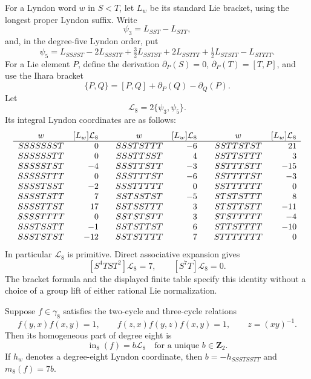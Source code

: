 For a Lyndon word $w$ in $S<T$, let $L_w$ be its standard Lie
bracket, using the longest proper Lyndon suffix. Write
\[
 \psi_3=L_{SST}-L_{STT},
\]
and, in the degree-five Lyndon order, put
\[
 \psi_5=L_{SSSST}-2L_{SSSTT}
       +\tfrac32 L_{SSTST}+2L_{SSTTT}
       +\tfrac12 L_{STSTT}-L_{STTTT}.
\]
For a Lie element $P$, define the derivation
$\partial_P(S)=0$, $\partial_P(T)=[T,P]$, and use the Ihara bracket
\[
 \{P,Q\}=[P,Q]+\partial_P(Q)-\partial_Q(P).
\]
Let
\[
 \mathcal L_8=2\{\psi_3,\psi_5\}.
\]
Its integral Lyndon coordinates are as follows:
\[
\begin{array}{cr@{\qquad}cr@{\qquad}cr}
 w&[L_w]\mathcal L_8&w&[L_w]\mathcal L_8&w&[L_w]\mathcal L_8\\ \hline
 SSSSSSST&0&SSSTSTTT&-6&SSTTSTST&21\\
 SSSSSSTT&0&SSSTTSST&4&SSTTSTTT&3\\
 SSSSSTST&-4&SSSTTSTT&-3&SSTTTSTT&-15\\
 SSSSSTTT&0&SSSTTTST&-6&SSTTTTST&-3\\
 SSSSTSST&-2&SSSTTTTT&0&SSTTTTTT&0\\
 SSSSTSTT&7&SSTSSTST&-5&STSTSTTT&8\\
 SSSSTTST&17&SSTSSTTT&3&STSTTSTT&-11\\
 SSSSTTTT&0&SSTSTSTT&3&STSTTTTT&-4\\
 SSSTSSTT&-1&SSTSTTST&6&STTSTTTT&-10\\
 SSSTSTST&-12&SSTSTTTT&7&STTTTTTT&0
\end{array}
\]
In particular $\mathcal L_8$ is primitive. Direct associative
expansion gives
\begin{equation}\label{eq:weight-eight-mixed-coefficient}
 [S^4TST^2]\mathcal L_8=7,
 \qquad [S^7T]\mathcal L_8=0.
\end{equation}
The bracket formula and the displayed finite table specify this
identity without a choice of a group lift of either rational Lie
normalization.

\begin{lemma}\label{lem:weight-eight-leading-line}
Suppose $f\in\gamma_8$ satisfies the two-cycle and three-cycle
relations
\[
 f(y,x)f(x,y)=1,\qquad
 f(z,x)f(y,z)f(x,y)=1,\qquad z=(xy)^{-1}.
\]
Then its homogeneous part of degree eight is
\[
 \operatorname{in}_8(f)=b\mathcal L_8\quad\text{for a unique }b\in\mathbf Z_2.
\]
If $h_w$ denotes a degree-eight Lyndon coordinate, then
$b=-h_{SSSTSSTT}$ and $m_8(f)=7b$.
\end{lemma}

